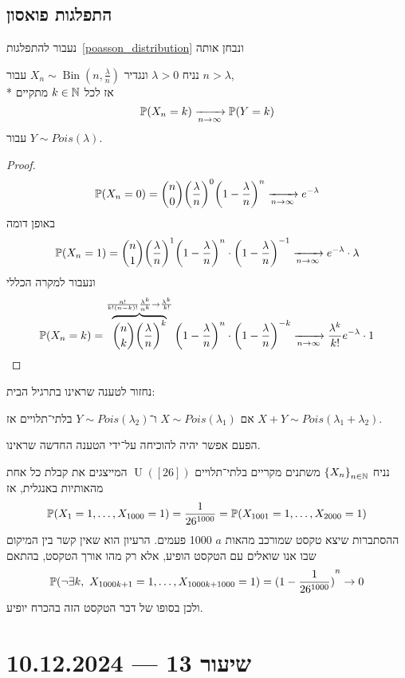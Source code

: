 \subsection{התפלגות פואסון}
נעבור להתפלגות\ \ref{poasson_distribution} ונבחן אותה
\begin{proposition}
	נניח $\lambda > 0$ ונגדיר $X_n \sim \operatorname{Bin}(n, \frac{\lambda}{n})$ עבור $n > \lambda$, \\*
	אז לכל $k \in \mathbb{N}$ מתקיים
	\[
		\mathbb{P}(X_n = k) \xrightarrow[n \to \infty]{} \mathbb{P}(Y = k)
	\]
	עבור $Y \sim Pois(\lambda)$.
\end{proposition}
\begin{proof}
	\[
		\mathbb{P}(X_n = 0)
		= \binom{n}{0} {\left(\frac{\lambda}{n}\right)}^0 {\left(1 - \frac{\lambda}{n}\right)}^n \xrightarrow[n \to \infty]{} e^{-\lambda}
	\]
	באופן דומה
	\[
		\mathbb{P}(X_n = 1)
		= \binom{n}{1} {\left(\frac{\lambda}{n}\right)}^1 {\left(1 - \frac{\lambda}{n}\right)}^n \cdot {\left(1 - \frac{\lambda}{n}\right)}^{-1} \xrightarrow[n \to \infty]{} e^{-\lambda} \cdot \lambda
	\]
	ונעבור למקרה הכללי
	\[
		\mathbb{P}(X_n = k)
		= \overbrace{\binom{n}{k} {\left(\frac{\lambda}{n}\right)}^k}^{\frac{n!}{k! (n - k)!} \frac{\lambda^k}{n^k} \to \frac{\lambda^k}{k!}} {\left(1 - \frac{\lambda}{n}\right)}^n \cdot {\left(1 - \frac{\lambda}{n}\right)}^{-k}
		\xrightarrow[n \to \infty]{} \frac{\lambda^k}{k!} e^{-\lambda} \cdot 1
	\]
\end{proof}
נחזור לטענה שראינו בתרגיל הבית:
\begin{proposition}
	אם $X \sim Pois(\lambda_1)$ ו־$Y \sim Pois(\lambda_2)$ בלתי־תלויים אז $X + Y \sim Pois(\lambda_1 + \lambda_2)$.
\end{proposition}
הפעם אפשר יהיה להוכיחה על־ידי הטענה החדשה שראינו.
\begin{example}
	נניח ${\{X_n\}}_{n \in \mathbb{N}}$ משתנים מקריים בלתי־תלויים $\operatorname{U}([26])$ המייצגים את קבלת כל אחת מהאותיות באנגלית, אז
	\[
		\mathbb{P}(X_1 = 1, \dots, X_{1000} = 1) = \frac{1}{26^{1000}} = \mathbb{P}(X_{1001} = 1, \dots, X_{2000} = 1)
	\]
	ההסתברות שיצא טקסט שמורכב מהאות $a$ 1000 פעמים.
	הרעיון הוא שאין קשר בין המיקום שבו אנו שואלים עם הטקסט הופיע, אלא רק מהו אורך הטקסט, בהתאם
	\[
		\mathbb{P}(\lnot \exists k,\ X_{1000 k + 1} = 1, \dots, X_{1000k + 1000} = 1)
		= {(1 - \frac{1}{26^{1000}})}^n
		\to 0
	\]
	ולכן בסופו של דבר הטקסט הזה בהכרח יופיע.
\end{example}

\section{שיעור 13 --- 10.12.2024}
